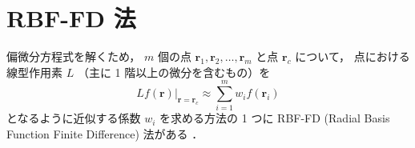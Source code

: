 %

\chapter{RBF-FD 法}\label{chap:pde_rbf-fd}

偏微分方程式を解くため，
$m$ 個の点 $\bm{r}_1, \bm{r}_2, \ldots, \bm{r}_m$ と点 $\bm{r}_c$ について，
点における線型作用素 $L$ （主に 1 階以上の微分を含むもの）を
\begin{equation}
    L f(\bm{r}) |_{\bm{r} = \bm{r}_c} \approx \sum_{i=1}^m w_i f(\bm{r}_i)
    \label{eq:pde_rbf-fd_approximation-formula}
\end{equation}
となるように近似する係数 $w_i$ を求める方法の 1 つに
RBF-FD (Radial Basis Function Finite Difference) 法がある \cite{Fornberg2015}．

